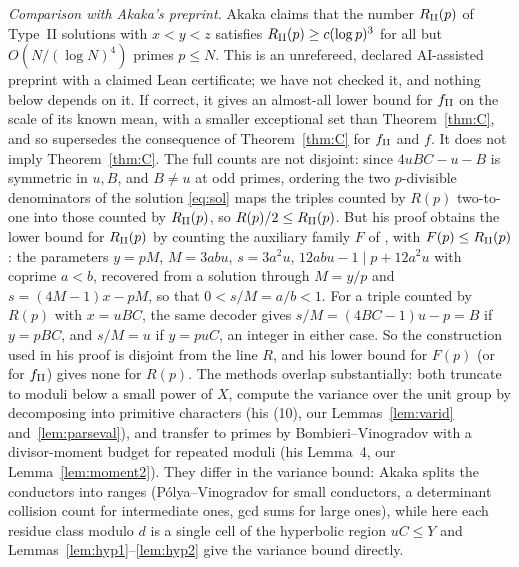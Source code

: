 \documentclass[11pt,reqno]{amsart}
\theoremstyle{definition}
\begin{document}
\emph{Comparison with Akaka's preprint.}  Akaka \cite[Thm.~1]{Akaka}
claims that the number $R_{\rm II}(p)$ of Type~II solutions with
$x<y<z$ satisfies $R_{\rm II}(p)\ge c(\log p)^3$ for all but
$O(N/(\log N)^4)$ primes $p\le N$.  This is an unrefereed, declared
AI-assisted preprint with a claimed Lean certificate; we have not
checked it, and nothing below depends on it.  If correct, it gives an
almost-all lower bound for $f_{\rm II}$ on the scale of its known mean,
with a smaller exceptional set than Theorem~\ref{thm:C}, and so
supersedes the consequence of Theorem~\ref{thm:C} for $f_{\rm II}$ and
$f$.  It does not imply Theorem~\ref{thm:C}.  The full counts are not
disjoint: since $4uBC-u-B$ is symmetric in $u,B$, and $B\ne u$ at odd
primes, ordering the two $p$-divisible denominators of the solution
\eqref{eq:sol} maps the triples counted by $R(p)$ two-to-one into
those counted by $R_{\rm II}(p)$, so $R(p)/2\le R_{\rm II}(p)$.  But
his proof obtains the lower bound for $R_{\rm II}(p)$ by counting the
auxiliary family $F$ of \cite[\S2, (7)]{Akaka}, with $F(p)\le R_{\rm
II}(p)$: the parameters $y=pM$, $M=3abu$, $s=3a^2u$, $12abu-1\mid
p+12a^2u$ with coprime $a<b$, recovered from a solution through
$M=y/p$ and $s=(4M-1)x-pM$, so that $0<s/M=a/b<1$.  For a triple
counted by $R(p)$ with $x=uBC$, the same decoder gives $s/M=(4BC-1)u-p=B$
if $y=pBC$, and $s/M=u$ if $y=puC$, an integer in either case.  So the
construction used in his proof is disjoint from the line $R$, and his
lower bound for $F(p)$ (or for $f_{\rm II}$) gives none for $R(p)$.  The methods overlap substantially: both truncate to
moduli below a small power of $X$, compute the variance over the unit
group by decomposing into primitive characters (his (10), our
Lemmas~\ref{lem:varid} and~\ref{lem:parseval}), and transfer to primes by
Bombieri--Vinogradov with a divisor-moment budget for repeated moduli
(his Lemma~4, our Lemma~\ref{lem:moment2}).  They differ in the variance
bound: Akaka splits the conductors into ranges (P\'olya--Vinogradov for
small conductors, a determinant collision count for intermediate ones,
gcd sums for large ones), while here each residue class modulo $d$ is a
single cell of the hyperbolic region $uC\le Y$ and
Lemmas~\ref{lem:hyp1}--\ref{lem:hyp2} give the variance bound
directly.
\end{document}
